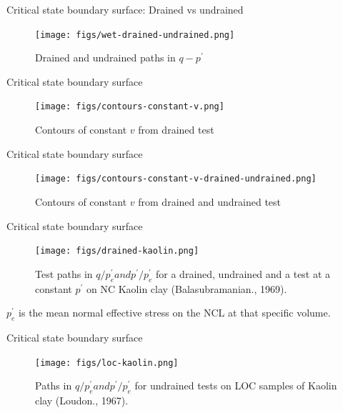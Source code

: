 \documentclass[notes]{beamer}
\begin{document}
\begin{frame}{Critical state boundary surface: Drained vs undrained}
	\begin{figure}
		\texttt{[image: figs/wet-drained-undrained.png]}
		\caption*{Drained and undrained paths in $q-p^\prime$}
	\end{figure}
\end{frame}

\begin{frame}{Critical state boundary surface}
	\begin{figure}
		\texttt{[image: figs/contours-constant-v.png]}
		\caption*{Contours of constant $v$ from drained test}
	\end{figure}
\end{frame}

\begin{frame}{Critical state boundary surface}
	\begin{figure}
		\texttt{[image: figs/contours-constant-v-drained-undrained.png]}
		\caption*{Contours of constant $v$ from drained and undrained test}
	\end{figure}
\end{frame}

\begin{frame}{Critical state boundary surface}
	\begin{figure}
		\texttt{[image: figs/drained-kaolin.png]}
		\caption*{Test paths in $q/p_e^\prime and p^\prime/p_e^\prime$ for a drained, undrained
		and a test at a constant $p^\prime$ on NC Kaolin clay (Balasubramanian., 1969).}
	\end{figure}
	$p_e^\prime$ is the mean normal effective stress on the NCL at that specific volume.
\end{frame}


\begin{frame}{Critical state boundary surface}
	\begin{figure}
		\texttt{[image: figs/loc-kaolin.png]}
		\caption*{Paths in $q/p_e^\prime and p^\prime/p_e^\prime$ for undrained tests on LOC samples of Kaolin clay (Loudon., 1967).}
	\end{figure}
\end{frame}
\end{document}
